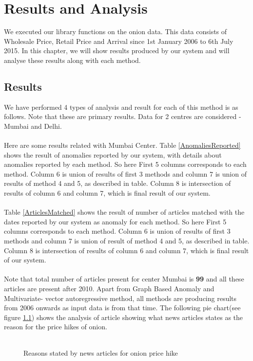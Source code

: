 \chapter{Results and Analysis}

We executed our library functions on the onion data. This data consists of 
Wholesale Price, Retail Price and Arrival since 1st January 2006 to 6th July 
2015. In this chapter, we will show results produced by our system and will 
analyse these results along with each method.

\section{Results}

We have performed 4 types of analysis and result for each of this method is as 
follows. Note that these are primary results. Data for 2 centres are considered 
- Mumbai and Delhi.\\
\\
Here are some results related with Mumbai Center. Table \ref{AnomaliesReported} shows the result of anomalies reported by our system, with details about anomalies reported by each method. So here First 5 columns corresponds to each method. Column 6 is union of results of first 3 methods and column 7 is union of results of method 4 and 5, as described in table. Column 8 is intersection of results of column 6 and column 7, which is final result of our system.\\
\\
Table \ref{ArticlesMatched} shows the result of number of articles matched with the dates reported by our system as anomaly for each method. So here First 5 columns corresponds to each method. Column 6 is union of results of first 3 methods and column 7 is union of result of method 4 and 5, as described in table. Column 8 is intersection of results of column 6 and column 7, which is final result of our system.\\
\\
Note that total number of articles present for center Mumbai is \textbf{99} and all these articles are present after 2010. Apart from Graph Based Anomaly and Multivariate- vector autoregressive method, all methods are producing results from 2006 onwards as input data is from that time. The following pie chart(see figure \ref{fig:pieReasons}) shows the analysis of article showing what news articles states as the reason for the price hikes of onion.\\
\\
\begin{figure}[H]
\centering
{}
\caption{Reasons stated by news articles for onion price hike}
\label{fig:pieReasons}
\end{figure}

